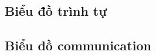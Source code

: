 \documentclass[../report.tex]{subfiles}
\begin{document}
\subsection{Biểu đồ trình tự}
\subsection{Biểu đồ communication}
\end{document}
